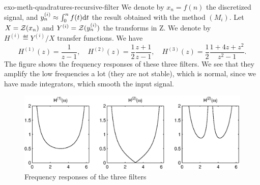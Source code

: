  
\begin{correction}{exo-meth-quadratures-recursive-filter}
We denote by $ x_n = f(n) $ the discretized signal, and $ y_n^{(i)} \approx \int_0^n{f(t) \mathrm{d} t} $ the result obtained with the method $ (M_i) $. Let $ X = \mathcal{Z} (x_n) $ and $ Y^{(i)} = \mathcal{Z} (y_n^{(i)}) $ the transforms in Z. We denote by $ H^{(i)} \eqdef Y^{(i)}/X $ transfer functions. We have
\begin{equation*}
H^{(1)} (z) = \frac{1}{z-1}, \quad H^{(2)} (z) = \frac{1}{2} \frac{z+1}{z-1}, \quad H^{(3)} (z) = \frac{1}{2} \frac{1 + 4z + z^2}{z^2-1}.
\end{equation*}
The figure  shows the frequency responses of these three filters. We see that they amplify the low frequencies a lot (they are not stable), which is normal, since we have made integrators, which smooth the input signal. 

\begin{figure}[ht]
    \begin{center}
    \includegraphics[scale=0.7]{images/meth-quadratures-filtre-recursif.eps}
    \end{center}
    \caption{Frequency responses of the three filters}
              \label{fig-meth-quadratures-recursive-filter}
\end{figure}
\end{correction}
 
